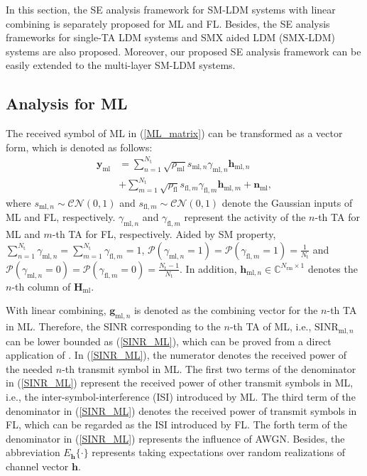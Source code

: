 \documentclass[journal]{IEEEtran}
\begin{document}
In this section, the SE analysis framework for SM-LDM systems with linear combining is separately proposed for ML and FL. Besides, the SE analysis frameworks for single-TA LDM systems and SMX aided LDM (SMX-LDM) systems are also proposed. Moreover, our proposed SE analysis framework can be easily extended to the multi-layer SM-LDM systems.

\subsection{Analysis for ML}

The received symbol of ML in (\ref{ML_matrix}) can be transformed as a vector form, which is denoted as follows:
\begin{equation}
\begin{split}
\mathbf{y}_\text{ml} &= \sum_{n=1}^{N_\text{t}} \sqrt{\rho_\text{ml}} s_{\text{ml},n} \gamma_{\text{ml},n} \mathbf{h}_{\text{ml},n} \\
&+ \sum_{m=1}^{N_\text{t}} \sqrt{\rho_\text{fl}} s_{\text{fl},m} \gamma_{\text{fl},m} \mathbf{h}_{\text{ml},m} + \mathbf{n}_\text{ml},
\label{ML_vector}
\end{split}
\end{equation}
where $s_{\text{ml},n} \sim \mathcal{CN}(0,1)$ and $s_{\text{fl},m} \sim \mathcal{CN}(0,1)$ denote the Gaussian inputs of ML and FL, respectively. $\gamma_{\text{ml},n}$ and $\gamma_{\text{fl},m}$ represent the activity of the $n$-th TA for ML and $m$-th TA for FL, respectively. Aided by SM property, $\sum_{n=1}^{N_\text{t}} \gamma_{\text{ml},n} = \sum_{m=1}^{N_\text{t}} \gamma_{\text{fl},m} = 1$, $\mathcal{P}(\gamma_{\text{ml},n} = 1) = \mathcal{P}(\gamma_{\text{fl},m} = 1) = \frac{1}{N_\text{t}}$ and $\mathcal{P}(\gamma_{\text{ml},n} = 0) = \mathcal{P}(\gamma_{\text{fl},m} = 0) = \frac{N_\text{t}-1}{N_\text{t}}$. In addition, $\mathbf{h}_{\text{ml},n} \in \mathbb{C}^{N_\text{rm}\times 1}$ denotes the $n$-th column of $\mathbf{H}_\text{ml}$.

With linear combining, $\mathbf{g}_{\text{ml},n}$ is denoted as the combining vector for the $n$-th TA in ML. Therefore, the SINR corresponding to the $n$-th TA of ML, i.e., $\text{SINR}_{\text{ml},n}$ can be lower bounded as (\ref{SINR_ML}), which can be proved from a direct application of \cite[Lemma~1]{Massive_SINR}. In (\ref{SINR_ML}), the numerator denotes the received power of the needed $n$-th transmit symbol in ML. The first two terms of the denominator in (\ref{SINR_ML}) represent the received power of other transmit symbols in ML, i.e., the inter-symbol-interference (ISI) introduced by ML. The third term of the denominator in (\ref{SINR_ML}) denotes the received power of transmit symbols in FL, which can be regarded as the ISI introduced by FL. The forth term of the denominator in (\ref{SINR_ML}) represents the influence of AWGN. Besides, the abbreviation $E_{\mathbf{h}}\{\cdot\}$  represents taking expectations over random realizations of channel vector $\mathbf{h}$.
\end{document}
